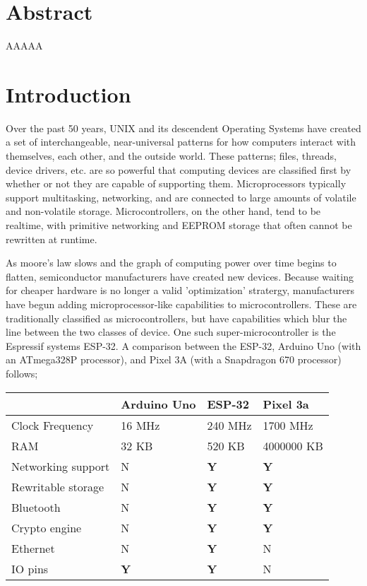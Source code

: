 \documentclass{article}
\begin{document}
\section{Abstract}
AAAAA

\tableofcontents
\section{Introduction}
Over the past 50 years, UNIX and its descendent Operating Systems have created a set of interchangeable, near-universal patterns for how computers interact with themselves, each other, and the outside world.
These patterns; files, threads, device drivers, etc. are so powerful that computing devices are classified first by whether or not they are capable of supporting them.
Microprocessors typically support multitasking, networking, and are connected to large amounts of volatile and non-volatile storage.
Microcontrollers, on the other hand, tend to be realtime, with primitive networking and EEPROM storage that often cannot be rewritten at runtime.

As moore's law slows and the graph of computing power over time begins to flatten, semiconductor manufacturers have created new devices.
Because waiting for cheaper hardware is no longer a valid 'optimization' stratergy, manufacturers have begun adding microprocessor-like capabilities to microcontrollers.
These are traditionally classified as microcontrollers, but have capabilities which blur the line between the two classes of device. 
One such super-microcontroller is the Espressif systems ESP-32. A comparison between the ESP-32, Arduino Uno (with an ATmega328P processor), and Pixel 3A (with a Snapdragon 670 processor) follows;

\begin{table}[h]
\begin{tabular}{l|l|l|l}
					& Arduino Uno		& ESP-32		& Pixel 3a		\\ \hline
Clock Frequency		& 16 MHz			& 240 MHz		& 1700 MHz		\\ \hline
RAM					& 32 KB				& 520 KB		& 4000000 KB	\\ \hline
Networking support	& N 				& \textbf{Y}	& \textbf{Y}	\\ \hline
Rewritable storage	& N 				& \textbf{Y}	& \textbf{Y}	\\ \hline
Bluetooth			& N 				& \textbf{Y}	& \textbf{Y}	\\ \hline
Crypto engine		& N 				& \textbf{Y}	& \textbf{Y}	\\ \hline
Ethernet			& N 				& \textbf{Y}	& N				\\ \hline
IO pins				& \textbf{Y}		& \textbf{Y}	& N				\\ \hline

\end{tabular}
\end{table}
\end{document}
